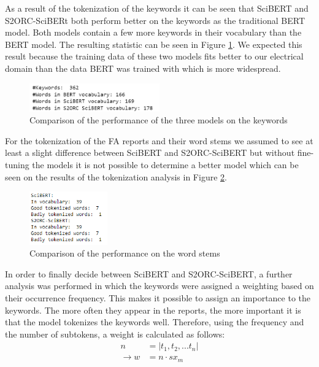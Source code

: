 As a result of the tokenization of the keywords it can be seen that SciBERT and S2ORC-SciBERt both perform better on the keywords as the traditional BERT model. Both models contain a few more keywords in their vocabulary than the BERT model. The resulting statistic can be seen in Figure \ref{fig:comparison}. We expected this result because the training data of these two models fits better to our electrical domain than the data BERT was trained with which is more widespread.


\begin{figure}[H]
	\centering
	\includegraphics[width=0.5\textwidth]{figures/keyword_comparison.PNG}
	\caption{Comparison of the performance of the three models on the keywords}
	\label{fig:comparison}
\end{figure}


For the tokenization of the FA reports and their word stems we assumed to see at least a slight difference between SciBERT and S2ORC-SciBERT but without fine-tuning the models it is not possible to determine a better model which can be seen on the results of the tokenization analysis in Figure \ref{fig:stemming_performance}.


\begin{figure}[H]
	\centering
	\includegraphics[width=0.3\textwidth]{figures/wordstems_comparison.PNG}
	\caption{Comparison of the performance on the word stems}
	\label{fig:stemming_performance}
\end{figure}

\alert{In order to finally decide between SciBERT and S2ORC-SciBERT, a further analysis was performed in which the keywords were assigned a weighting based on their occurrence frequency. This makes it possible to assign an importance to the keywords. The more often they appear in the reports, the more important it is that the model tokenizes the keywords well. Therefore, using the frequency and the number of subtokens, a weight is calculated as follows:}
\begin{align}
	n &= |t_1, t_2, ... t_n| \\
	\to w &= n \cdot sx_m
\end{align}

